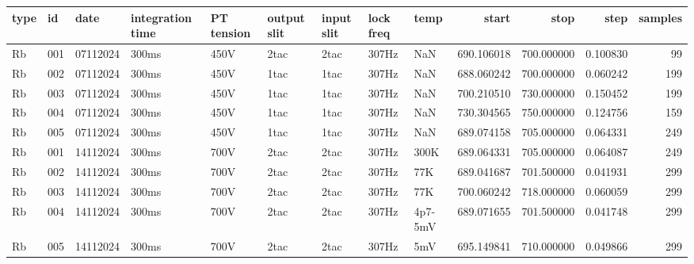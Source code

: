 \begin{tabular}{lllllllllrrrr}
\toprule
type & id & date & integration time & PT tension & output slit & input slit & lock freq & temp & start & stop & step & samples \\
\midrule
Rb & 001 & 07112024 & 300ms & 450V & 2tac & 2tac & 307Hz & NaN & 690.106018 & 700.000000 & 0.100830 & 99 \\
Rb & 002 & 07112024 & 300ms & 450V & 1tac & 1tac & 307Hz & NaN & 688.060242 & 700.000000 & 0.060242 & 199 \\
Rb & 003 & 07112024 & 300ms & 450V & 1tac & 1tac & 307Hz & NaN & 700.210510 & 730.000000 & 0.150452 & 199 \\
Rb & 004 & 07112024 & 300ms & 450V & 1tac & 1tac & 307Hz & NaN & 730.304565 & 750.000000 & 0.124756 & 159 \\
Rb & 005 & 07112024 & 300ms & 450V & 1tac & 1tac & 307Hz & NaN & 689.074158 & 705.000000 & 0.064331 & 249 \\
Rb & 001 & 14112024 & 300ms & 700V & 2tac & 2tac & 307Hz & 300K & 689.064331 & 705.000000 & 0.064087 & 249 \\
Rb & 002 & 14112024 & 300ms & 700V & 2tac & 2tac & 307Hz & 77K & 689.041687 & 701.500000 & 0.041931 & 299 \\
Rb & 003 & 14112024 & 300ms & 700V & 2tac & 2tac & 307Hz & 77K & 700.060242 & 718.000000 & 0.060059 & 299 \\
Rb & 004 & 14112024 & 300ms & 700V & 2tac & 2tac & 307Hz & 4p7-5mV & 689.071655 & 701.500000 & 0.041748 & 299 \\
Rb & 005 & 14112024 & 300ms & 700V & 2tac & 2tac & 307Hz & 5mV & 695.149841 & 710.000000 & 0.049866 & 299 \\
\bottomrule
\end{tabular}
